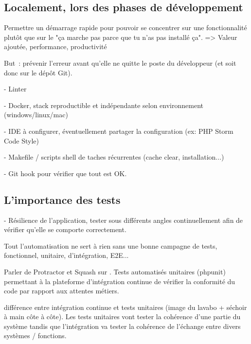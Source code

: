 \subsection{Localement, lors des phases de développement}


Permettre un démarrage rapide pour pouvoir se concentrer sur une fonctionnalité plutôt que sur le "ça marche pas parce que tu n’as pas installé ça". => Valeur ajoutée, performance, productivité

But : prévenir l'erreur avant qu'elle ne quitte le poste du développeur (et soit donc sur le dépôt Git).

-  Linter

-  Docker, stack reproductible et indépendante selon environnement (windows/linux/mac) 

- IDE à configurer, éventuellement partager la configuration (ex: PHP Storm Code Style)

-  Makefile / scripts shell de taches récurrentes (cache clear, installation...)

- Git hook pour vérifier que tout est OK.


\subsection{L'importance des tests}



- Résilience de l'application, tester sous différents angles continuellement afin de vérifier qu'elle se comporte correctement.

Tout l'automatisation ne sert à rien sans une bonne campagne de tests, fonctionnel, unitaire, d'intégration, E2E...

Parler de Protractor et Squash sur \bv. Tests automatisés unitaires (phpunit) permettant à la plateforme d'intégration continue de vérifier la conformité du code par rapport aux attentes métiers.

différence entre intégration continue et tests unitaires (image du lavabo + séchoir à main côte à côte). Les tests unitaires vont tester la cohérence d'une partie du système tandis que l'intégration va tester la cohérence de l'échange entre divers systèmes / fonctions.

